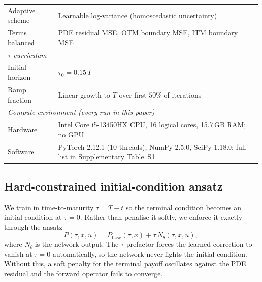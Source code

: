 \documentclass[preprint,12pt]{elsarticle}
\begin{document}
\begin{table}[!htbp]
\begin{tabularx}{\linewidth}{@{}l >{\raggedright\arraybackslash}X@{}}
Adaptive scheme & Learnable log-variance (homoscedastic uncertainty) \\
Terms balanced & PDE residual MSE, OTM boundary MSE, ITM boundary MSE \\
\midrule
\multicolumn{2}{l}{\textit{$\tau$-curriculum}} \\
Initial horizon & $\tau_0 = 0.15\,T$ \\
Ramp fraction & Linear growth to $T$ over first $50\%$ of iterations \\
\midrule
\multicolumn{2}{l}{\textit{Compute environment (every run in this paper)}} \\
Hardware & Intel Core i5-13450HX CPU, 16 logical cores, 15.7\,GB RAM; no GPU \\
Software & PyTorch 2.12.1 (10 threads), NumPy 2.5.0, SciPy 1.18.0; full list in
Supplementary Table~S1 \\
\bottomrule
\end{tabularx}
\end{table}

\subsection{Hard-constrained initial-condition ansatz}
\label{sec:ansatz}
We train in time-to-maturity $\tau = T-t$ so the terminal condition becomes an
initial condition at $\tau{=}0$. Rather than penalise it softly, we enforce it
exactly through the ansatz
\begin{equation}
  P(\tau,x,u) = P_{\mathrm{base}}(\tau,x) + \tau\,N_\theta(\tau,x,u),
  \label{eq:ansatz}
\end{equation}
where $N_\theta$ is the network output. The $\tau$ prefactor forces the learned
correction to vanish at $\tau{=}0$ automatically, so the network never fights the
initial condition. Without this, a soft penalty for the terminal payoff
oscillates against the PDE residual and the forward operator fails to converge.
\end{document}
